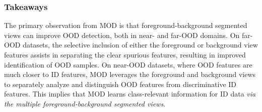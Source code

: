 
\subsubsection{Takeaways}
\label{sec:propwork-mod-results-takeaway}
The primary observation from MOD is that foreground-background segmented views can improve OOD detection, both in near- and far-OOD domains. On far-OOD datasets, the selective inclusion of either the foreground or background view features assists in separating the clear spurious features, resulting in improved identification of OOD samples. On near-OOD datasets, where OOD features are much closer to ID features, MOD leverages the foreground and background views to separately analyze and distinguish OOD features from discriminative ID features. This implies that MOD learns class-relevant information for ID data \emph{via the multiple foreground-background segmented views}. 


